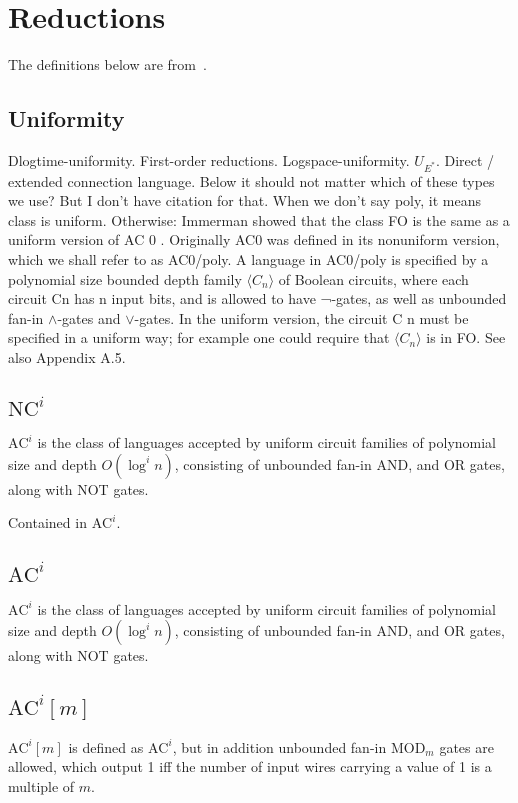 \chapter{Reductions}
\label{chap:reductions}
The definitions below are from~\cite{10.5555/520668}.


\section{Uniformity}
Dlogtime-uniformity. First-order reductions. Logspace-uniformity. $U_{E^*}$. Direct / extended connection language.
Below it should not matter which of these types we use? But I don't have citation for that.
When we don't say poly, it means class is uniform. Otherwise: Immerman showed that the class FO is the same as a uniform version
of AC 0 . Originally AC0 was defined in its nonuniform version, which
we shall refer to as AC0/poly. A language in AC0/poly is specified by
a polynomial size bounded depth family $\langle C_n \rangle$ of Boolean circuits, where
each circuit Cn has n input bits, and is allowed to have ¬-gates, as well as
unbounded fan-in $\land$-gates and $\lor$-gates. In the uniform version, the circuit
C n must be specified in a uniform way; for example one could require that
$\langle C_n \rangle$ is in FO. See also Appendix A.5.


\section{$\text{NC}^i$}
$\text{AC}^i$ is the class of languages accepted by uniform circuit
families of polynomial size and depth $O(\log^i n)$, consisting of unbounded fan-in
AND, and OR gates, along with NOT gates.

Contained in $\text{AC}^i$.

\section{$\text{AC}^i$}
$\text{AC}^i$ is the class of languages accepted by uniform circuit
families of polynomial size and depth $O(\log^i n)$, consisting of unbounded fan-in
AND, and OR gates, along with NOT gates.

\section{$\text{AC}^i[m]$}
$\text{AC}^i[m]$ is defined as $\text{AC}^i$, but in addition unbounded fan-in $\text{MOD}_m$ gates
are allowed, which output 1 iff the number of input wires carrying a value of 1 is a
multiple of $m$.

